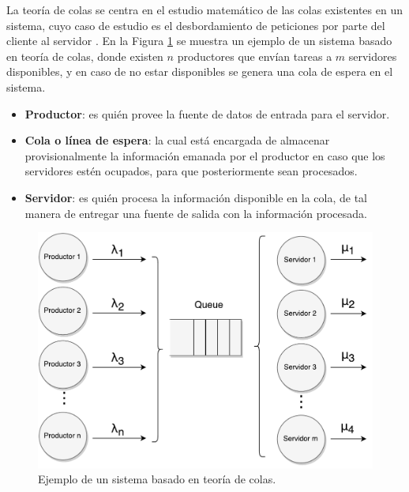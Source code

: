 La teoría de colas se centra en el estudio matemático de las colas existentes en un sistema, cuyo caso de estudio es el desbordamiento de peticiones por parte del cliente al servidor \citep{queueingtheory}. En la Figura \ref{fig:teoriaColas} se muestra un ejemplo de un sistema basado en teoría de colas, donde existen $n$ productores que envían tareas a $m$ servidores disponibles, y en caso de no estar disponibles se genera una cola de espera en el sistema.

\begin{itemize}
	\item \textbf{Productor}: es quién provee la fuente de datos de entrada para el servidor.
	\item \textbf{Cola o línea de espera}: la cual está encargada de almacenar provisionalmente la información emanada por el productor en caso que los servidores estén ocupados, para que posteriormente sean procesados.
	\item \textbf{Servidor}: es quién procesa la información disponible en la cola, de tal manera de entregar una fuente de salida con la información procesada.
\end{itemize}

\begin{figure}[!ht]
	\centering
	\includegraphics[scale=0.6]{images/TeoriaColas.pdf}
	\caption{Ejemplo de un sistema basado en teoría de colas.}
	\label{fig:teoriaColas}
\end{figure}

